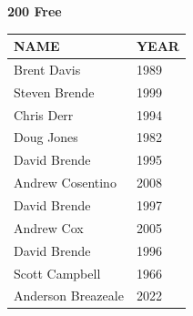 \begin{table}[H]
\centering
\begin{minipage}[t]{0.6\textwidth}
\centering
\textbf{200 Free}\\[0.1cm]
\begin{tabular}{@{}p{2.8cm}p{1.2cm}@{}}
\hline
    \textbf{NAME} & \textbf{YEAR} \\
\hline
    Brent Davis & 1989 \\
    Steven Brende & 1999 \\
    Chris Derr & 1994 \\
    Doug Jones & 1982 \\
    David Brende & 1995 \\
    Andrew Cosentino & 2008 \\
    David Brende & 1997 \\
    Andrew Cox & 2005 \\
    David Brende & 1996 \\
    Scott Campbell & 1966 \\
    Anderson Breazeale & 2022 \\
\hline
\end{tabular}
\end{minipage}
\end{table}

